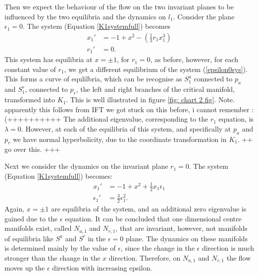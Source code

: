 Then we expect the behaviour of the flow on the two invariant planes to be influenced by the two equilibria and the dynamics on $l_1$.
Consider the plane $\epsilon_1=0$. The system (Equation \ref{K1systemfull}) becomes
\begin{equation}
\begin{aligned} \label{epsilon0sys}
x_1' &= -1 +x^2 - \left( \frac{1}{3}r_1x_1^3 \right)\\
r_1' &= 0.
\end{aligned}
\end{equation}
This system has equilibria at $x= \pm1$, for $r_1=0$, as before, however, for each constant value of $r_1$, we get a different equilibrium of the system (\ref{epsilon0sys}). This forms a curve of equlilbria, which can be recognise as $S^a_1$ connected to $p_a$ and $S^r_1$, connected to $p_r$, the left and right branches of the critical manifold, transformed into $K_1$. This is well illustrated in figure \ref{fig: chart 2 fig}. Note. apparently this follows from IFT we got stuck on this before, i cannot remember :(++++++++++
The additional eigenvalue, corresponding to the $r_1$ equation, is $\lambda=0$. However, at each of the equilibria of this system, and specifically at $p_a$ and $p_r$ we have normal hyperbolicity, due to the coordinate transformation in $K_1$. ++ go over this. +++

Next we consider the dynamics on the invariant plane $r_1=0$.
The system (Equation \ref{K1systemfull}) becomes: 
\begin{equation}
\begin{aligned}
x_1' &= -1 +x^2 + \frac{1}{2} x_1 \epsilon_1 \\
\epsilon_1' &= \frac{3}{2} \epsilon_1^2 .
\end{aligned}
\end{equation}
Again, $x= \pm 1$ are equilibria of the system, and an additional zero eigenvalue is gained due to the $\epsilon$ equation. It can be concluded that one dimensional centre manifolds exist, called $N_{a,1}$ and $N_{r,1}$, that are invariant, however, not manifolds of equilibria like $S^a$ and $S^r$ in the $\epsilon=0$ plane. The dynamics on these manifolds is determined mainly by the value of $\epsilon$, since the change in the $\epsilon$ direction is much stronger than the change in the $x$ direction. Therefore, on $N_{a,1}$ and $N_{r,1}$ the flow moves up the $\epsilon$ direction with increasing epsilon.

